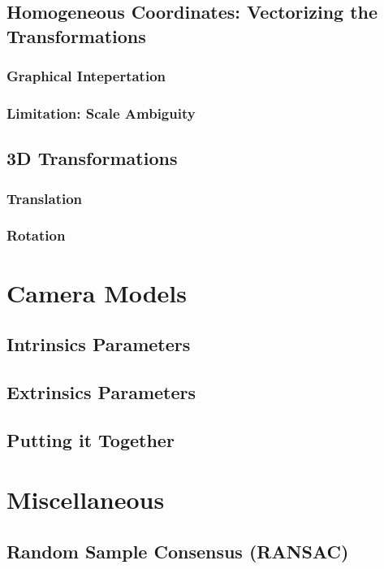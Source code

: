\documentclass{book}
\begin{document}
            \subsection{Homogeneous Coordinates: Vectorizing the Transformations}
                \subsubsection{Graphical Intepertation}

                \subsubsection{Limitation: Scale Ambiguity}

            \subsection{3D Transformations}
                \subsubsection{Translation}

                \subsubsection{Rotation}

        \section{Camera Models}
            \subsection{Intrinsics Parameters}

            \subsection{Extrinsics Parameters}

            \subsection{Putting it Together}

        \section{Miscellaneous}
            \subsection{Random Sample Consensus (RANSAC)}
        
\end{document}
